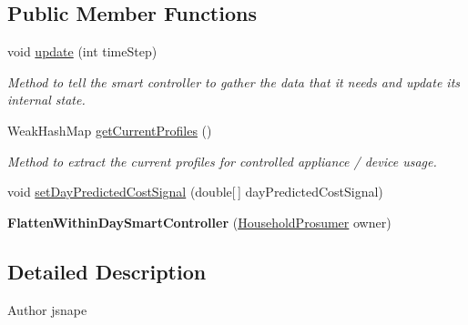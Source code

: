 \subsection*{Public Member Functions}
\begin{DoxyCompactItemize}
\item 
void \hyperlink{classuk_1_1ac_1_1dmu_1_1iesd_1_1cascade_1_1controllers_1_1_flatten_within_day_smart_controller_a3ebf53ea02fef9b1d40527cac3e17c2f}{update} (int time\-Step)
\begin{DoxyCompactList}\small\item\em Method to tell the smart controller to gather the data that it needs and update its internal state. \end{DoxyCompactList}\item 
Weak\-Hash\-Map \hyperlink{classuk_1_1ac_1_1dmu_1_1iesd_1_1cascade_1_1controllers_1_1_flatten_within_day_smart_controller_a62f289fb63e12b9e9b7dc07027e1ea50}{get\-Current\-Profiles} ()
\begin{DoxyCompactList}\small\item\em Method to extract the current profiles for controlled appliance / device usage. \end{DoxyCompactList}\item 
void \hyperlink{classuk_1_1ac_1_1dmu_1_1iesd_1_1cascade_1_1controllers_1_1_flatten_within_day_smart_controller_a99da0181036318d5663653b577032194}{set\-Day\-Predicted\-Cost\-Signal} (double\mbox{[}$\,$\mbox{]} day\-Predicted\-Cost\-Signal)
\item 
\hypertarget{classuk_1_1ac_1_1dmu_1_1iesd_1_1cascade_1_1controllers_1_1_flatten_within_day_smart_controller_a21ba681d928fdd41291e3bcc6da8dd00}{{\bfseries Flatten\-Within\-Day\-Smart\-Controller} (\hyperlink{classuk_1_1ac_1_1dmu_1_1iesd_1_1cascade_1_1agents_1_1prosumers_1_1_household_prosumer}{Household\-Prosumer} owner)}\label{classuk_1_1ac_1_1dmu_1_1iesd_1_1cascade_1_1controllers_1_1_flatten_within_day_smart_controller_a21ba681d928fdd41291e3bcc6da8dd00}

\end{DoxyCompactItemize}


\subsection{Detailed Description}
\begin{DoxyAuthor}{Author}
jsnape 
\end{DoxyAuthor}


